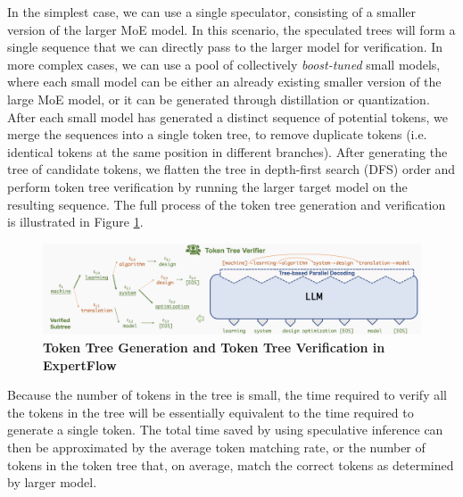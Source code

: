 In the simplest case, we can use a single speculator, consisting of a smaller version of the larger MoE model. In this scenario, the speculated trees will form a single sequence that we can directly pass to the larger model for verification. In more complex cases, we can use a pool of collectively \textit{boost-tuned} small models, where each small model can be either an already existing smaller version of the large MoE model, or it can be generated through distillation or quantization. After each small model has generated a distinct sequence of potential tokens, we merge the sequences into a single token tree, to remove duplicate tokens (i.e. identical tokens at the same position in different branches). After generating the tree of candidate tokens, we flatten the tree in depth-first search (DFS) order and perform token tree verification by running the larger target model on the resulting sequence. The full process of the token tree generation and verification is illustrated in Figure \ref{fig:token-tree-verification}.
\begin{figure}[H]
    \centering
    \includegraphics[width=\linewidth]{figures/token-tree-verification.png}
    \caption{\textbf{Token Tree Generation and Token Tree Verification in ExpertFlow}}
    \label{fig:token-tree-verification}
\end{figure}

Because the number of tokens in the tree is small, the time required to verify all the tokens in the tree will be essentially equivalent to the time required to generate a single token. The total time saved by using speculative inference can then be approximated by the average token matching rate, or the number of tokens in the token tree that, on average, match the correct tokens as determined by larger model.


